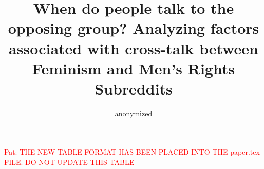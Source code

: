 \documentclass[letterpaper]{article}
\newcommand{\pat}[1]{{\textcolor{red}{Pat: #1}}}
\begin{document}
\title{When do people talk to the opposing group? Analyzing factors associated with cross-talk between Feminism and Men's Rights Subreddits}


\author{anonymized}



\maketitle



\pat{THE NEW TABLE FORMAT HAS BEEN PLACED INTO THE paper.tex FILE.  DO NOT UPDATE THIS TABLE}
\end{document}
